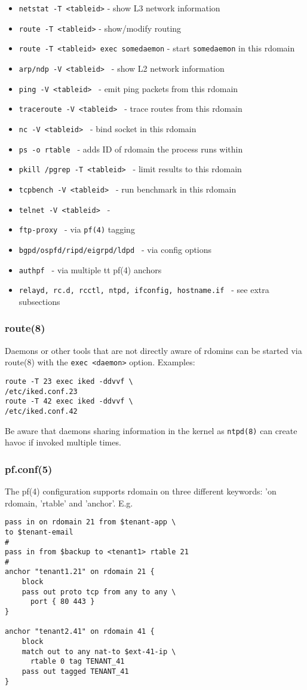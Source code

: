 \documentclass[letterpaper,twocolumn,10pt]{article}
\begin{document}
\begin{itemize}
\item {\tt netstat -T <tableid>} \-- show L3 network information
\item {\tt  route -T <tableid>} \-- show/modify routing
\item {\tt  route -T <tableid> exec somedaemon} \-- start {\tt somedaemon} in this rdomain
\item {\tt  arp/ndp -V <tableid> } \-- show L2 network information
\item {\tt  ping -V <tableid> } \-- emit ping packets from this rdomain
\item {\tt  traceroute -V <tableid> } \-- trace routes from this rdomain
\item {\tt  nc -V <tableid> } \-- bind socket in this rdomain
\item {\tt  ps -o rtable } \-- adds ID of rdomain the process runs within
\item {\tt  pkill /pgrep -T <tableid> } \-- limit results to this rdomain
\item {\tt  tcpbench -V <tableid> } \-- run benchmark in this rdomain
\item {\tt  telnet -V <tableid> } \-- 
\item {\tt  ftp-proxy } \-- via {\tt pf(4)} tagging
\item {\tt  bgpd/ospfd/ripd/eigrpd/ldpd } \-- via config options
\item {\tt  authpf } \-- via multiple  {tt pf(4)} anchors
\item {\tt  relayd, rc.d, rcctl, ntpd, ifconfig, hostname.if } \-- see extra subsections
\end{itemize}

\subsubsection{route(8)}
Daemons or other tools that are not directly aware of rdomins can be started via route(8)
with the {\tt exec <daemon>} option. Examples: 
\begin{verbatim}
route -T 23 exec iked -ddvvf \
/etc/iked.conf.23
route -T 42 exec iked -ddvvf \
/etc/iked.conf.42
\end{verbatim}
Be aware that daemons sharing information in the kernel as {\tt ntpd(8)} can create havoc if invoked
multiple times.

\subsubsection{pf.conf(5)}
The pf(4) configuration supports rdomain on three different keywords: 'on rdomain, 'rtable' and 'anchor'. E.g.
\begin{verbatim}
pass in on rdomain 21 from $tenant-app \
to $tenant-email
#
pass in from $backup to <tenant1> rtable 21
#
anchor "tenant1.21" on rdomain 21 {
    block
    pass out proto tcp from any to any \
      port { 80 443 }
}

anchor "tenant2.41" on rdomain 41 {
    block
    match out to any nat-to $ext-41-ip \
      rtable 0 tag TENANT_41
    pass out tagged TENANT_41
}
\end{verbatim}
\end{document}
